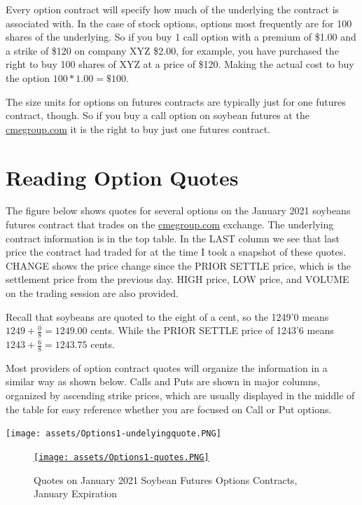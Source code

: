 \documentclass[
  letterpaper,
  DIV=11,
  numbers=noendperiod]{scrreprt}
\begin{document}
Every option contract will specify how much of the underlying the
contract is associated with. In the case of stock options, options most
frequently are for 100 shares of the underlying. So if you buy 1 call
option with a premium of \$1.00 and a strike of \$120 on company XYZ
\$2.00, for example, you have purchased the right to buy 100 shares of
XYZ at a price of \$120. Making the actual cost to buy the option
\(100*1.00 = \$100\).

The size units for options on futures contracts are typically just for
one futures contract, though. So if you buy a call option on soybean
futures at the \url{cmegroup.com} it is the right to buy just one
futures contract.

\hypertarget{reading-option-quotes}{%
\section{Reading Option Quotes}\label{reading-option-quotes}}

The figure below shows quotes for several options on the January 2021
soybeans futures contract that trades on the \url{cmegroup.com}
exchange. The underlying contract information is in the top table. In
the LAST column we see that last price the contract had traded for at
the time I took a snapshot of these quotes. CHANGE shows the price
change since the PRIOR SETTLE price, which is the settlement price from
the previous day. HIGH price, LOW price, and VOLUME on the trading
session are also provided.

Recall that soybeans are quoted to the eight of a cent, so the 1249'0
means \(1249 + \frac{0}{8} = 1249.00\) cents. While the PRIOR SETTLE
price of 1243'6 means \(1243 + \frac{6}{8} = 1243.75\) cents.

Most providers of option contract quotes will organize the information
in a similar way as shown below. Calls and Puts are shown in major
columns, organized by ascending strike prices, which are usually
displayed in the middle of the table for easy reference whether you are
focused on Call or Put options.

\texttt{[image: assets/Options1-undelyingquote.PNG]}

\begin{figure}

{\centering 

\href{https://www.cmegroup.com/trading/agricultural/grain-and-oilseed/soybean_contract_specifications.html}{\texttt{[image: assets/Options1-quotes.PNG]}}

}

\caption{Quotes on January 2021 Soybean Futures Options Contracts,
January Expiration}

\end{figure}
\end{document}
